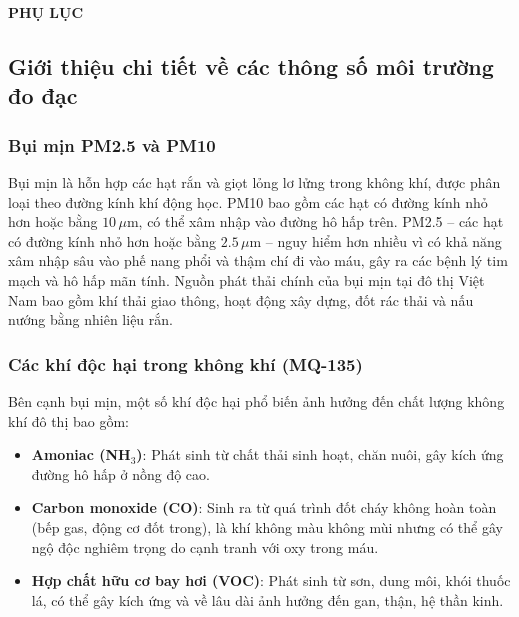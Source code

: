\documentclass[12pt,a4paper]{article}
\renewcommand{\thesubparagraph}{\Alph{subparagraph}.}
\begin{document}
\newpage
\begin{center}
    \textbf{\Large PHỤ LỤC}
\end{center}
\renewcommand{\thesubsection}{\Alph{subsection}.}
\renewcommand{\thesubsubsection}{\Alph{subsection}.\arabic{subsubsection}}
\renewcommand{\theparagraph}{\Alph{subsection}.\arabic{subsubsection}.\arabic{paragraph}}
\renewcommand{\thesubparagraph}{\Alph{subparagraph}.}
\setcounter{subsection}{0}


\subsection{Giới thiệu chi tiết về các thông số môi trường đo đạc}

\subsubsection{Bụi mịn PM2.5 và PM10}
Bụi mịn là hỗn hợp các hạt rắn và giọt lỏng lơ lửng trong không khí, được phân loại theo đường kính khí động học. PM10 bao gồm các hạt có đường kính nhỏ hơn hoặc bằng $10\,\mu\text{m}$, có thể xâm nhập vào đường hô hấp trên. PM2.5 -- các hạt có đường kính nhỏ hơn hoặc bằng $2.5\,\mu\text{m}$ -- nguy hiểm hơn nhiều vì có khả năng xâm nhập sâu vào phế nang phổi và thậm chí đi vào máu, gây ra các bệnh lý tim mạch và hô hấp mãn tính. Nguồn phát thải chính của bụi mịn tại đô thị Việt Nam bao gồm khí thải giao thông, hoạt động xây dựng, đốt rác thải và nấu nướng bằng nhiên liệu rắn.

\subsubsection{Các khí độc hại trong không khí (MQ-135)}
Bên cạnh bụi mịn, một số khí độc hại phổ biến ảnh hưởng đến chất lượng không khí đô thị bao gồm:
\begin{itemize}
    \item \textbf{Amoniac (NH$_3$)}: Phát sinh từ chất thải sinh hoạt, chăn nuôi, gây kích ứng đường hô hấp ở nồng độ cao.
    \item \textbf{Carbon monoxide (CO)}: Sinh ra từ quá trình đốt cháy không hoàn toàn (bếp gas, động cơ đốt trong), là khí không màu không mùi nhưng có thể gây ngộ độc nghiêm trọng do cạnh tranh với oxy trong máu.
    \item \textbf{Hợp chất hữu cơ bay hơi (VOC)}: Phát sinh từ sơn, dung môi, khói thuốc lá, có thể gây kích ứng và về lâu dài ảnh hưởng đến gan, thận, hệ thần kinh.
\end{itemize}
\end{document}
